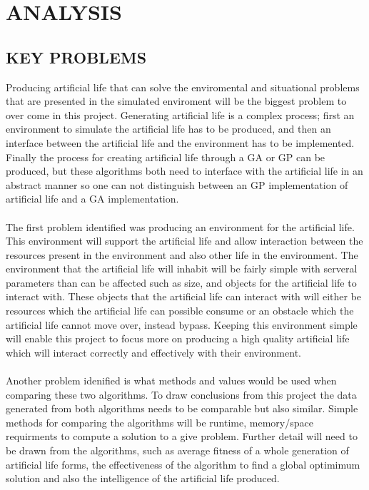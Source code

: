 \documentclass[10pt,twocolumn]{article}
\begin{document}
\section{ANALYSIS}

\subsection{KEY PROBLEMS}
Producing artificial life that can solve the enviromental and situational problems that are presented in the simulated enviroment %
will be the biggest problem to over come in this project. Generating artificial life is a complex process; first an environment to simulate the artificial life has to be produced, and then
an interface between the artificial life and the environment has to be implemented. Finally the process for creating artificial life through a GA or GP can be produced, but these algorithms
both need to interface with the artificial life in an abstract manner so one can not distinguish between an GP implementation of artificial life and a GA implementation.

\paragraph{}
The first problem identified was producing an environment for the artificial life. This environment will support the artificial life and allow interaction between the resources present
in the environment and also other life in the environment. The environment that the artificial life will inhabit will be fairly simple with serveral parameters than can be affected such as
size, and objects for the artificial life to interact with. These objects that the artificial life can interact with will either be resources which the artificial life can possible consume
or an obstacle which the artificial life cannot move over, instead bypass. Keeping this environment simple will enable this project to focus more on producing a high quality artificial life
which will interact correctly and effectively with their environment. 

\paragraph{}
Another problem idenified is what methods and values would be used when comparing these two algorithms. To draw conclusions from this project the data generated from both algorithms needs 
to be comparable but also similar. Simple methods for comparing the algorithms will be runtime, memory/space requirments to compute a solution to a give problem. Further detail will need to
be drawn from the algorithms, such as average fitness of a whole generation of artificial life forms, the effectiveness of the algorithm to find a global optimimum solution and also the
intelligence of the artificial life produced. 
\end{document}
